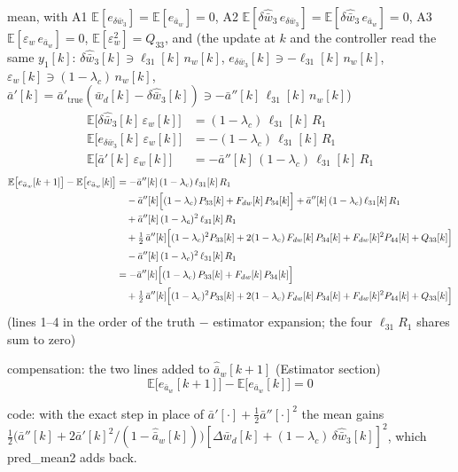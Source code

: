 \documentclass[11pt,a4paper,fontset=none]{ctexart}
\newcommand{\ba}{\bar{a}}
\newcommand{\bw}{\bar{w}}
\newcommand{\E}{\mathbb{E}}
\begin{document}
mean, with A1 $\E[e_{\delta\bw_3}] = \E[e_{\ba_w}] = 0$,
A2 $\E[\delta\hat{\bw}_3\,e_{\delta\bw_3}] = \E[\delta\hat{\bw}_3\,e_{\ba_w}] = 0$,
A3 $\E[\varepsilon_w\,e_{\ba_w}] = 0$, $\E[\varepsilon_w^{2}] = Q_{33}$,
and (the update at $k$ and the controller read the same $y_1[k]$:
$\delta\hat{\bw}_3[k] \ni \ell_{31}[k]\,n_w[k]$, $e_{\delta\bw_3}[k] \ni -\ell_{31}[k]\,n_w[k]$,
$\varepsilon_w[k] \ni (1-\lambda_c)\,n_w[k]$,
$\ba'[k] = \ba'_{\mathrm{true}}(\bw_d[k] - \delta\hat{\bw}_3[k]) \ni -\ba''[k]\,\ell_{31}[k]\,n_w[k]$)
\begin{align*}
\E\bigl[\delta\hat{\bw}_3[k]\,\varepsilon_w[k]\bigr] &= (1-\lambda_c)\,\ell_{31}[k]\,R_1 \\
\E\bigl[e_{\delta\bw_3}[k]\,\varepsilon_w[k]\bigr] &= -(1-\lambda_c)\,\ell_{31}[k]\,R_1 \\
\E\bigl[\ba'[k]\,\varepsilon_w[k]\bigr] &= -\ba''[k]\,(1-\lambda_c)\,\ell_{31}[k]\,R_1
\end{align*}
\begingroup\small
\begin{align*}
\E\bigl[e_{\ba_w}[k+1]\bigr] - \E\bigl[e_{\ba_w}[k]\bigr]
  &= - \ba''[k]\,(1-\lambda_c)\,\ell_{31}[k]\,R_1 \\
  &\quad - \ba''[k]\Bigl[(1-\lambda_c)\,P_{33}[k] + F_{dw}[k]\,P_{34}[k]\Bigr]
     + \ba''[k]\,(1-\lambda_c)\,\ell_{31}[k]\,R_1 \\
  &\quad + \ba''[k]\,(1-\lambda_c)^{2}\,\ell_{31}[k]\,R_1 \\
  &\quad + \tfrac{1}{2}\,\ba''[k]\Bigl[(1-\lambda_c)^{2}P_{33}[k]
      + 2(1-\lambda_c)\,F_{dw}[k]\,P_{34}[k]
      + F_{dw}[k]^{2}P_{44}[k] + Q_{33}[k]\Bigr] \\
  &\quad - \ba''[k]\,(1-\lambda_c)^{2}\,\ell_{31}[k]\,R_1 \\
  &= - \ba''[k]\Bigl[(1-\lambda_c)\,P_{33}[k] + F_{dw}[k]\,P_{34}[k]\Bigr] \\
  &\quad + \tfrac{1}{2}\,\ba''[k]\Bigl[(1-\lambda_c)^{2}P_{33}[k]
      + 2(1-\lambda_c)\,F_{dw}[k]\,P_{34}[k]
      + F_{dw}[k]^{2}P_{44}[k] + Q_{33}[k]\Bigr]
\end{align*}
\endgroup
(lines 1--4 in the order of the truth $-$ estimator expansion; the four $\ell_{31}R_1$ shares sum to zero)

compensation: the two lines added to $\hat{\ba}_w[k+1]$ (Estimator section)
\begin{equation*}
\E\bigl[e_{\ba_w}[k+1]\bigr] - \E\bigl[e_{\ba_w}[k]\bigr] = 0
\end{equation*}

code: with the exact step in place of $\ba'[\cdot] + \tfrac{1}{2}\ba''[\cdot]^{2}$ the
mean gains $\tfrac{1}{2}\bigl(\ba''[k] + 2\ba'[k]^{2}/(1-\hat{\ba}_w[k])\bigr)
[\Delta\bw_d[k] + (1-\lambda_c)\,\delta\hat{\bw}_3[k]]^{2}$, which pred\_mean2 adds back.
\end{document}

